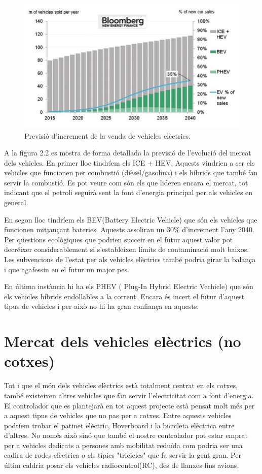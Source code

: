 \begin{figure}[H]
		\centering
    	\includegraphics[width=\textwidth]{Marcteoric/ev-sales-distrib.png}
     	\caption{Previsió d'increment de la venda de vehicles elèctrics.}
\end{figure}

A la figura 2.2 es mostra de forma detallada la previsió de l'evolució del mercat dels vehicles. En primer lloc tindríem els ICE + HEV. Aquests vindrien a ser els vehicles que funcionen per combustió (dièsel/gasolina) i els híbrids que també fan servir la combustió. Es pot veure com són els que lideren encara el mercat, tot indicant que el petroli seguirà sent la font d'energia principal per als vehicles en general. 

En segon lloc tindríem els BEV(Battery Electric Vehicle) que són els vehicles que funcionen mitjançant bateries. Aquests assoliran un 30\% \newline d'increment l'any 2040. Per qüestions ecològiques que podrien succeir en el futur aquest valor pot decréixer considerablement si s'estableixen límits de contaminació molt baixos. Les subvencions de l'estat per als vehicles elèctrics també podria girar la balança i que agafessin en el futur un major pes.
 

En última instància hi ha els PHEV ( Plug-In Hybrid Electric Vechicle) que són els vehicles híbrids endollables a la corrent. Encara és incert el futur d'aquest tipus de vehicles i per això no hi ha gran confiança en aquests.

\section{Mercat dels vehicles elèctrics (no cotxes)}

Tot i que el món dels vehicles elèctrics està totalment centrat en els cotxes, també existeixen altres vehicles que fan servir l'electricitat com a font \newline d'energia. El controlador que es plantejarà en tot aquest projecte està pensat molt més per a aquest tipus de vehicles que no pas per a cotxes. Entre aquests vehicles podríem trobar el patinet elèctric, Hoverboard i la bicicleta elèctrica entre d'altres. No només això sinó que també el nostre controlador pot estar emprat per a vehicles dedicats a persones amb mobilitat reduïda com podria ser una cadira de rodes elèctrica o els típics "tricicles" que fa servir la gent gran. Per últim caldria posar els vehicles radiocontrol(RC), des de llanxes fins avions. 

